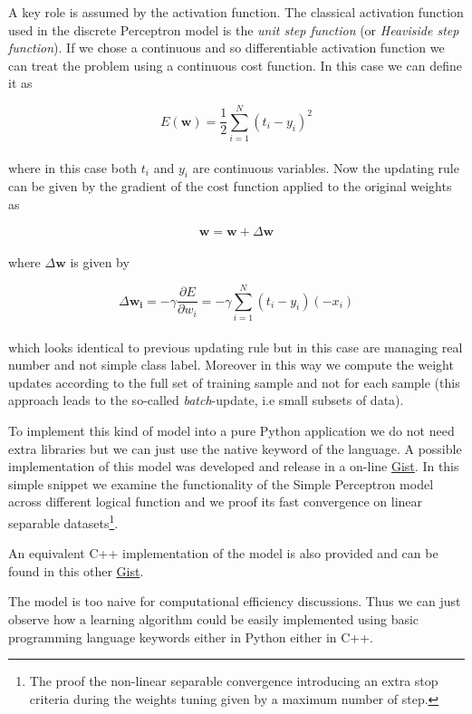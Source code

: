 \documentclass{standalone}
\begin{document}
A key role is assumed by the activation function.
The classical activation function used in the discrete Perceptron model is the \emph{unit step function} (or \emph{Heaviside step function}).
If we chose a continuous and so differentiable activation function we can treat the problem using a continuous cost function.
In this case we can define it as

$$
E(\mathbf{w}) = \frac{1}{2}\sum_{i=1}^{N}\left( t_i - y_i \right)^2
$$
\\
where in this case both $t_i$ and $y_i$ are continuous variables.
Now the updating rule can be given by the gradient of the cost function applied to the original weights as

$$
\mathbf{w} = \mathbf{w} + \Delta\mathbf{w}
$$
\\
where $\Delta\mathbf{w}$ is given by

$$
\Delta\mathbf{w_i} = -\gamma\frac{\partial E}{\partial w_i} = -\gamma\sum_{i=1}^{N} \left( t_i - y_i \right)\left(-x_i \right)
$$
\\
which looks identical to previous updating rule but in this case are managing real number and not simple class label.
Moreover in this way we compute the weight updates according to the full set of training sample and not for each sample (this approach leads to the so-called \emph{batch}-update, i.e small subsets of data).

To implement this kind of model into a pure Python application we do not need extra libraries but we can just use the native keyword of the language.
A possible implementation of this model was developed and release in a on-line \href{https://gist.github.com/Nico-Curti/358b7a2ffed1abbb57ee87a5338ca073}{Gist}.
In this simple snippet we examine the functionality of the Simple Perceptron model across different logical function and we proof its fast convergence on linear separable datasets\footnote{
  The proof the non-linear separable convergence introducing an extra stop criteria during the weights tuning given by a maximum number of step.
}.

An equivalent C++ implementation of the model is also provided and can be found in this other \href{https://gist.github.com/Nico-Curti/856c3baf523bc5d01b1e7dfe2515c0e2}{Gist}.

The model is too naive for computational efficiency discussions.
Thus we can just observe how a learning algorithm could be easily implemented using basic programming language keywords either in Python either in C++.
\end{document}
